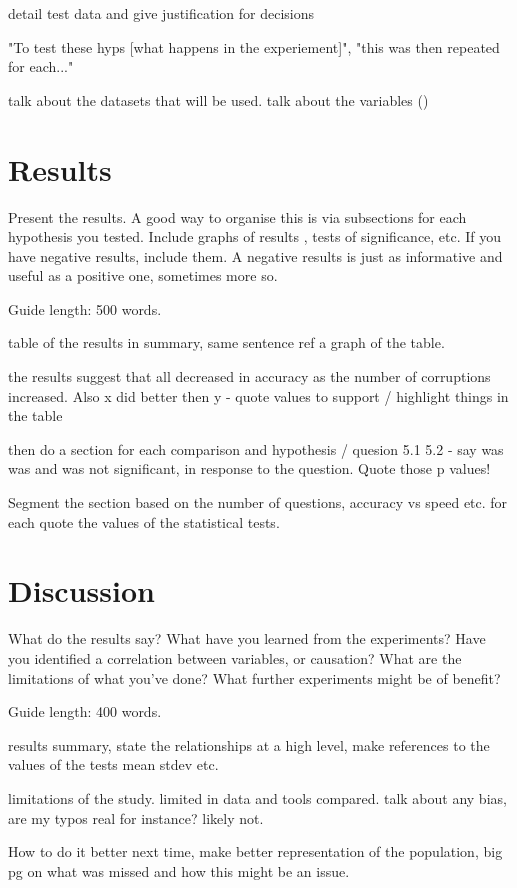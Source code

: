 \documentclass{csfourzero}
\begin{document}
detail test data and give justification for decisions

"To test these hyps [what happens in the experiement]", "this was then repeated for each..."

talk about the datasets that will be used. talk about the variables ()

\section{Results}
\label{sec:results}

Present the results. A good way to organise this is via subsections
for each hypothesis you tested. Include graphs of results
, tests of significance, etc. If you have
negative results, include them. A negative results is just as
informative and useful as a positive one, sometimes more so.

Guide length: 500 words.

table of the results in summary, same sentence ref a graph of the table.

the results suggest that all decreased in accuracy as the number of corruptions increased. Also x did better then y - quote values to support / highlight things in the table

then do a section for each comparison and hypothesis / quesion 5.1 5.2 - say was was and was not significant, in response to the question. Quote those p values!

Segment the section based on the number of questions, accuracy vs speed etc. for each quote the values of the statistical tests.

\section{Discussion}
\label{sec:discuss}

What do the results say? What have you learned from the
experiments? Have you identified a correlation between variables, or
causation? What are the limitations of what you've done? What further
experiments might be of benefit?

Guide length: 400 words.

results summary, state the relationships at a high level, make references to the values of the tests mean stdev etc.

limitations of the study. limited in data and tools compared. talk about any bias, are my typos real for instance? likely not.

How to do it better next time, make better representation of the population, big pg on what was missed and how this might be an issue.
\end{document}
